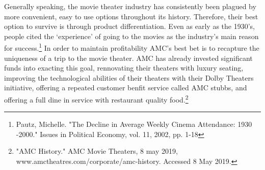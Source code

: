 \documentclass[12pt]{article}
\begin{document}
Generally speaking, the movie theater industry has consistently been plagued by more convenient, easy to use options throughout its history. Therefore, their best option to survive is through product differentiation. Even as early as the 1930’s, people cited the ‘experience’ of going to the movies as the industry’s main reason for success.\footnote{Pautz, Michelle. "The Decline in Average Weekly Cinema Attendance: 1930 -2000." Issues in Political
    Economy, vol. 11, 2002, pp. 1-18} In order to maintain profitability AMC’s best bet is to recapture the uniqueness of a trip to the movie theater. AMC has already invested significant funds into exacting this goal, rennovating their theaters with luxury seating, improving the technological abilities of their theaters with their Dolby Theaters initiative, offering a repeated customer benfit service called AMC stubbs, and offering a full dine in service with restaurant quality food.\footnote{"AMC History." AMC Movie Theaters, 8 may 2019, www.amctheatres.com/corporate/amc-history. Accessed 8 
     May 2019. }
\end{document}
